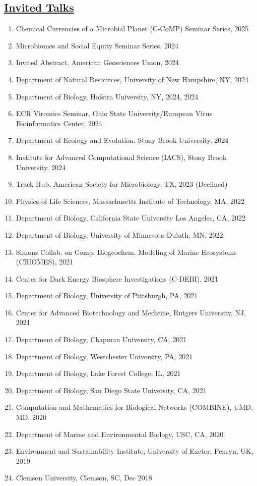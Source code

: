 \documentclass[]{res}
\begin{document}
\begin{resume}
   \section{\underline{Invited Talks}} \vspace{2mm}
    \begin{enumerate}[leftmargin=*]
\item Chemical Currencies of a Microbial Planet (C-CoMP) Seminar Series, 2025
\item Microbiomes and Social Equity Seminar Series, 2024 
\item Invited Abstract, American Geosciences Union, 2024 
\item Department of Natural Resources, University of New Hampshire, NY, 2024
\item Department of Biology, Hofstra University, NY, 2024, 2024
\item ECR Viromics Seminar, Ohio State University/European Virus Bioinformatics Center, 2024
\item Department of Ecology and Evolution, Stony Brook University, 2024
\item Institute for Advanced Computational Science (IACS), Stony Brook University, 2024
\item Track Hub, American Society for Microbiology, TX, 2023 (Declined)
\item Physics of Life Sciences, Massachusetts Institute of Technology, MA, 2022
\item Department of Biology, California State University Los Angeles, CA, 2022
\item Department of Biology, University of Minnesota Duluth, MN, 2022
\item Simons Collab. on Comp. Biogeochem. Modeling of Marine Ecosystems (CBIOMES), 2021
\item Center for Dark Energy Biosphere Investigations (C-DEBI), 2021
\item Department of Biology, University of Pittsburgh, PA, 2021
\item Center for Advanced Biotechnology and Medicine, Rutgers University, NJ, 2021
\item Department of Biology, Chapman University, CA, 2021
\item Department of Biology, Westchester University, PA, 2021
\item Department of Biology, Lake Forest College, IL, 2021
\item Department of Biology, San Diego State University, CA, 2021
\item Computation and Mathematics for Biological Networks (COMBINE), UMD, MD, 2020
\item Department of Marine and Environmental Biology, USC, CA, 2020
\item Environment and Sustainability Institute, University of Exeter, Penryn, UK, 2019
\item Clemson University, Clemson, SC, Dec 2018
\end{enumerate}
 


\end{resume}
\end{document}
